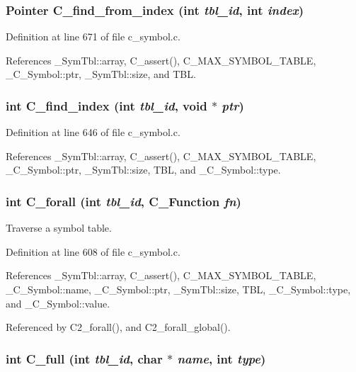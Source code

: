\subsubsection{\setlength{\rightskip}{0pt plus 5cm}\bf{Pointer} C\_\-find\_\-from\_\-index (int {\em tbl\_\-id}, int {\em index})}\label{c__symbol_8c_3b66fec0ccf9115ed3cfa0bf166c6344}




Definition at line 671 of file c\_\-symbol.c.

References \_\-Sym\-Tbl::array, C\_\-assert(), C\_\-MAX\_\-SYMBOL\_\-TABLE, \_\-C\_\-Symbol::ptr, \_\-Sym\-Tbl::size, and TBL.
\subsubsection{\setlength{\rightskip}{0pt plus 5cm}int C\_\-find\_\-index (int {\em tbl\_\-id}, void $\ast$ {\em ptr})}\label{c__symbol_8c_bafb54deffd152722f44aa5bab194a6f}




Definition at line 646 of file c\_\-symbol.c.

References \_\-Sym\-Tbl::array, C\_\-assert(), C\_\-MAX\_\-SYMBOL\_\-TABLE, \_\-C\_\-Symbol::ptr, \_\-Sym\-Tbl::size, TBL, and \_\-C\_\-Symbol::type.
\subsubsection{\setlength{\rightskip}{0pt plus 5cm}int C\_\-forall (int {\em tbl\_\-id}, \bf{C\_\-Function} {\em fn})}\label{c__symbol_8c_dce0ead9ac62b8796f3ec67b8dcd2012}


Traverse a symbol table. 

Definition at line 608 of file c\_\-symbol.c.

References \_\-Sym\-Tbl::array, C\_\-assert(), C\_\-MAX\_\-SYMBOL\_\-TABLE, \_\-C\_\-Symbol::name, \_\-C\_\-Symbol::ptr, \_\-Sym\-Tbl::size, TBL, \_\-C\_\-Symbol::type, and \_\-C\_\-Symbol::value.

Referenced by C2\_\-forall(), and C2\_\-forall\_\-global().
\subsubsection{\setlength{\rightskip}{0pt plus 5cm}int C\_\-full (int {\em tbl\_\-id}, char $\ast$ {\em name}, int {\em type})}\label{c__symbol_8c_b5f3bc613574a44dae7d72a5a97b2f5c}


